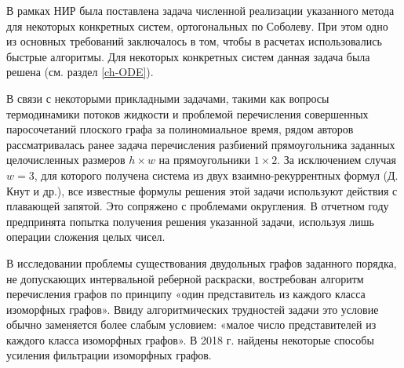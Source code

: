 В рамках НИР была поставлена задача численной реализации указанного метода для некоторых конкретных систем, ортогональных по Соболеву. При этом одно из основных требований заключалось в том, чтобы в расчетах использовались быстрые алгоритмы. Для некоторых конкретных систем данная задача была решена (см. раздел \ref{ch-ODE}).














В связи с некоторыми прикладными задачами, такими как вопросы термодинамики потоков жидкости и проблемой перечисления совершенных паросочетаний плоского графа за полиномиальное время, рядом авторов рассматривалась ранее задача перечисления разбиений прямоугольника заданных целочисленных размеров $h\times w$ на прямоугольники $1\times 2$.
За исключением  случая $w=3$, для которого получена система из двух взаимно-рекуррентных формул (Д. Кнут и др.), все известные формулы решения этой задачи используют действия с плавающей запятой. Это сопряжено с проблемами округления.
%
В отчетном году предпринята попытка получения решения указанной задачи, используя лишь операции сложения целых чисел.


В исследовании проблемы существования двудольных графов заданного порядка, не допускающих интервальной реберной раскраски, востребован алгоритм перечисления графов по принципу «один представитель из каждого класса изоморфных графов». Ввиду алгоритмических трудностей задачи это условие обычно заменяется более слабым условием: «малое число представителей из каждого класса изоморфных графов». В 2018 г. найдены некоторые способы усиления фильтрации изоморфных графов.

